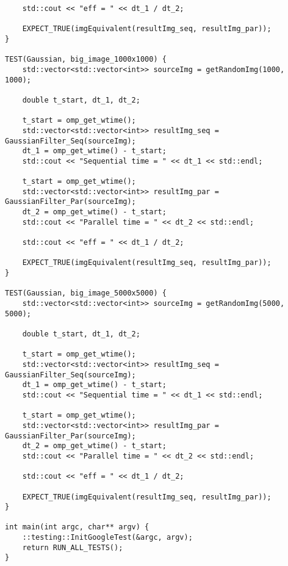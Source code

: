 \documentclass{report}
\begin{document}
\begin{lstlisting}
    std::cout << "eff = " << dt_1 / dt_2;

    EXPECT_TRUE(imgEquivalent(resultImg_seq, resultImg_par));
}

TEST(Gaussian, big_image_1000x1000) {
    std::vector<std::vector<int>> sourceImg = getRandomImg(1000, 1000);

    double t_start, dt_1, dt_2;

    t_start = omp_get_wtime();
    std::vector<std::vector<int>> resultImg_seq = GaussianFilter_Seq(sourceImg);
    dt_1 = omp_get_wtime() - t_start;
    std::cout << "Sequential time = " << dt_1 << std::endl;

    t_start = omp_get_wtime();
    std::vector<std::vector<int>> resultImg_par = GaussianFilter_Par(sourceImg);
    dt_2 = omp_get_wtime() - t_start;
    std::cout << "Parallel time = " << dt_2 << std::endl;

    std::cout << "eff = " << dt_1 / dt_2;

    EXPECT_TRUE(imgEquivalent(resultImg_seq, resultImg_par));
}

TEST(Gaussian, big_image_5000x5000) {
    std::vector<std::vector<int>> sourceImg = getRandomImg(5000, 5000);

    double t_start, dt_1, dt_2;

    t_start = omp_get_wtime();
    std::vector<std::vector<int>> resultImg_seq = GaussianFilter_Seq(sourceImg);
    dt_1 = omp_get_wtime() - t_start;
    std::cout << "Sequential time = " << dt_1 << std::endl;

    t_start = omp_get_wtime();
    std::vector<std::vector<int>> resultImg_par = GaussianFilter_Par(sourceImg);
    dt_2 = omp_get_wtime() - t_start;
    std::cout << "Parallel time = " << dt_2 << std::endl;

    std::cout << "eff = " << dt_1 / dt_2;

    EXPECT_TRUE(imgEquivalent(resultImg_seq, resultImg_par));
}

int main(int argc, char** argv) {
    ::testing::InitGoogleTest(&argc, argv);
    return RUN_ALL_TESTS();
}
\end{lstlisting}
\newpage
\end{document}
